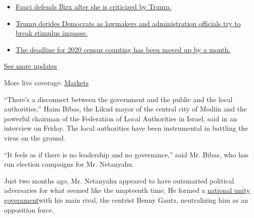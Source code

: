 \begin{itemize}
\tightlist
\item
  \href{https://www.nytimes3xbfgragh.onion/2020/08/03/world/coronavirus-covid-19.html?action=click\&pgtype=Article\&state=default\&region=MAIN_CONTENT_1\&context=storylines_live_updates\#link-4547638f}{Fauci
  defends Birx after she is criticized by Trump.}
\item
  \href{https://www.nytimes3xbfgragh.onion/2020/08/03/world/coronavirus-covid-19.html?action=click\&pgtype=Article\&state=default\&region=MAIN_CONTENT_1\&context=storylines_live_updates\#link-15e7f995}{Trump
  derides Democrats as lawmakers and administration officials try to
  break stimulus impasse.}
\item
  \href{https://www.nytimes3xbfgragh.onion/2020/08/03/world/coronavirus-covid-19.html?action=click\&pgtype=Article\&state=default\&region=MAIN_CONTENT_1\&context=storylines_live_updates\#link-e5a2cda}{The
  deadline for 2020 census counting has been moved up by a month.}
\end{itemize}

\href{https://www.nytimes3xbfgragh.onion/2020/08/03/world/coronavirus-covid-19.html?action=click\&pgtype=Article\&state=default\&region=MAIN_CONTENT_1\&context=storylines_live_updates}{See
more updates}

More live coverage:
\href{https://www.nytimes3xbfgragh.onion/live/2020/08/03/business/stock-market-today-coronavirus?action=click\&pgtype=Article\&state=default\&region=MAIN_CONTENT_1\&context=storylines_live_updates}{Markets}

``There's a disconnect between the government and the public and the
local authorities,'' Haim Bibas, the Likud mayor of the central city of
Modiin and the powerful chairman of the Federation of Local Authorities
in Israel, said in an interview on Friday. The local authorities have
been instrumental in battling the virus on the ground.

``It feels as if there is no leadership and no governance,'' said Mr.
Bibas, who has run election campaigns for Mr. Netanyahu.

Just two months ago, Mr. Netanyahu appeared to have outsmarted political
adversaries for what seemed like the umpteenth time. He formed a
\href{https://www.nytimes3xbfgragh.onion/2020/05/17/world/middleeast/israel-netanyahu-gantz-government.html?searchResultPosition=16}{national
unity government}with his main rival, the centrist Benny Gantz,
neutralizing him as an opposition force.

